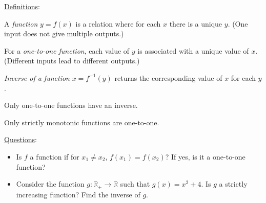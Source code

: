 \documentclass{./../../latex/handout}
\begin{document}
\thispagestyle{plain}
\newcommand{\mytitle}{Functions}
\myheader{\mytitle}

\vspace{0.5em}
\underline{Definitions}:
\begin{witemize}
	\item A \textit{function} $y=f(x)$ is a relation where for each $x$ there is a unique $y$. (One input does not give multiple outputs.)
	\item For a \textit{one-to-one function}, each value of $y$ is associated with a unique value of $x$. (Different inputs lead to different outputs.)
	\item \textit{Inverse of a function} $x=f^{-1}(y)$ returns the corresponding value of $x$ for each $y$. 
	\item Only one-to-one functions have an inverse.
	\item Only strictly monotonic functions are one-to-one.
\end{witemize}
\vspace{1cm}
\underline{Questions}:
\begin{itemize}
	\item Is $f$ a function if for $ x_1 \neq x_2 $, $f(x_1) = f(x_2)$? If yes, is it a one-to-one function? \\ \vspace{3cm}
	\item Consider the function $g: \mathbb{R}_{+} \rightarrow \mathbb{R}$ such that $g(x) = x^2 + 4 $. Is $g$ a strictly increasing function? Find the inverse of $g$. 
\end{itemize}
\end{document}
